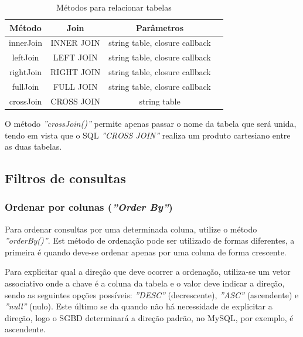 \begin{table}[ht]
\centering
\vspace{0.5cm}
\begin{tabular}{|c|c|c|c|}
\hline  
Método & Join & Parâmetros \\
\hline 
innerJoin   & INNER JOIN & string table, closure callback \\
leftJoin    & LEFT JOIN  & string table, closure callback \\
rightJoin   & RIGHT JOIN & string table, closure callback \\
fullJoin    & FULL JOIN  & string table, closure callback \\
crossJoin   & CROSS JOIN & string table                   \\
\hline
\end{tabular}
\caption{Métodos para relacionar tabelas}
\label{tab:joins}
\end{table}


\label{scripts/query_with_join.php}

O método \textit{''crossJoin()''} permite apenas passar o nome da tabela que será unida, tendo em vista que o SQL \textit{''CROSS JOIN''} realiza um produto cartesiano entre as duas tabelas.

\subsection{Filtros de consultas}

\subsubsection{Ordenar por colunas (\textit{''Order By''})}

Para ordenar consultas por uma determinada coluna, utilize o método \textit{''orderBy()''}. Est método de ordenação pode ser utilizado de formas diferentes, a primeira é quando deve-se ordenar apenas por uma coluna de forma crescente.

\spaceH{}

\label{scripts/query_with_order_by.php}

Para explicitar qual a direção que deve ocorrer a ordenação, utiliza-se um vetor associativo onde a chave é a coluna da tabela e o valor deve indicar a direção, sendo as seguintes opções possíveis: \textit{''DESC''} (decrescente), \textit{''ASC''} (ascendente) e \textit{''null''} (nulo). Este último se da quando não há necessidade de explicitar a direção, logo o SGBD determinará a direção padrão, no MySQL, por exemplo, é ascendente.

